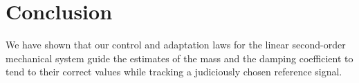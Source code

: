 \section{Conclusion}
\label{sec:conclusion}

We have shown that our control and adaptation laws for the linear second-order
mechanical system guide the estimates of the mass and the damping coefficient
to tend to their correct values while tracking a judiciously chosen reference
signal.
